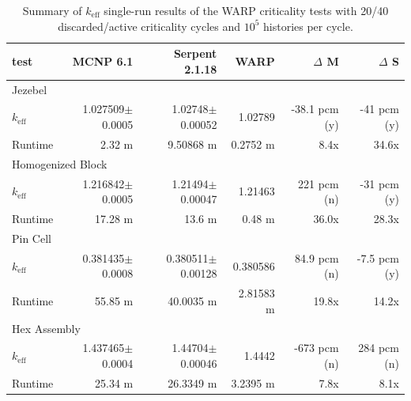 \begin{table}[h]
\centering
\caption{Summary of $k_\mathrm{eff}$ single-run results of the WARP criticality tests with 20/40 discarded/active criticality cycles and $10^5$ histories per cycle.}
\label{test_summary_5}
\begin{tabular}{| l | r | r | r | r | r |}
 \hline
 test & MCNP 6.1 & Serpent 2.1.18 & WARP & $\Delta$ M & $\Delta$ S  \\
\hline
\hline
\multicolumn{6}{|l|}{Jezebel}  \\
\hline
 $k_\mathrm{eff}$ & 1.027509$\pm$0.0005 & 1.02748$\pm$0.00052 & 1.02789 & -38.1 pcm (y) & -41 pcm (y) \\
 \hline
 Runtime               & 2.32 m & 9.50868 m & 0.2752 m & 8.4x  & 34.6x  \\
 \hline
 \hline
\multicolumn{6}{|l|}{Homogenized Block }\\
\hline
 $k_\mathrm{eff}$ & 1.216842$\pm$0.0005 & 1.21494$\pm$0.00047 & 1.21463 & 221 pcm (n)  & -31 pcm  (y) \\
 \hline
 Runtime               &  17.28 m & 13.6 m & 0.48 m & 36.0x  & 28.3x  \\
 \hline
  \hline
\multicolumn{6}{|l|}{Pin Cell}\\
\hline
 $k_\mathrm{eff}$ & 0.381435$\pm$0.0008 &  0.380511$\pm$0.00128 & 0.380586 & 84.9 pcm (n)&  -7.5 pcm (y)    \\
 \hline
 Runtime               & 55.85 m & 40.0035 m &  2.81583 m &  19.8x & 14.2x  \\
 \hline
  \hline
\multicolumn{6}{|l|}{Hex Assembly}\\
\hline
 $k_\mathrm{eff}$ & 1.437465$\pm$0.0004 & 1.44704$\pm$0.00046 & 1.4442 & -673 pcm (n) & 284 pcm (n) \\
 \hline
 Runtime               & 25.34 m &  26.3349 m &  3.2395 m  & 7.8x & 8.1x  \\
 \hline
\end{tabular}
\end{table}


